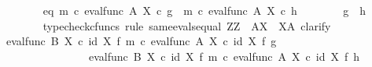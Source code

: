 \begin{isabellebody}
\isanewline
\ \ \ \ \ \ \isamarkupfalse%
\ eq{\isacharcolon}{\kern0pt}\ {\isachardoublequoteopen}{\isacharparenleft}{\kern0pt}m\ {\isasymcirc}\isactrlsub c\ eval{\isacharunderscore}{\kern0pt}func\ A\ X{\isacharparenright}{\kern0pt}\isactrlsup {\isasymsharp}\ {\isasymcirc}\isactrlsub c\ g\ {\isacharequal}{\kern0pt}\ {\isacharparenleft}{\kern0pt}m\ {\isasymcirc}\isactrlsub c\ eval{\isacharunderscore}{\kern0pt}func\ A\ X{\isacharparenright}{\kern0pt}\isactrlsup {\isasymsharp}\ {\isasymcirc}\isactrlsub c\ h{\isachardoublequoteclose}\isanewline
\ \ \ \ \ \ \isamarkupfalse%
\ {\isachardoublequoteopen}g\ {\isacharequal}{\kern0pt}\ h{\isachardoublequoteclose}\isanewline
\ \ \ \ \ \ \isamarkupfalse%
\ {\isacharparenleft}{\kern0pt}typecheck{\isacharunderscore}{\kern0pt}cfuncs{\isacharcomma}{\kern0pt}\ rule\ same{\isacharunderscore}{\kern0pt}evals{\isacharunderscore}{\kern0pt}equal{\isacharbrackleft}{\kern0pt}\ Z{\isacharequal}{\kern0pt}Z{\isacharcomma}{\kern0pt}\ \ A{\isacharequal}{\kern0pt}X{\isacharcomma}{\kern0pt}\ \ X{\isacharequal}{\kern0pt}A{\isacharbrackright}{\kern0pt}{\isacharcomma}{\kern0pt}\ clarify{\isacharparenright}{\kern0pt}\isanewline
\ \ \ \ \ \ \ \ \ \ \isamarkupfalse%
\ {\isachardoublequoteopen}{\isacharparenleft}{\kern0pt}{\isacharparenleft}{\kern0pt}eval{\isacharunderscore}{\kern0pt}func\ B\ X{\isacharparenright}{\kern0pt}\ {\isasymcirc}\isactrlsub c\ {\isacharparenleft}{\kern0pt}id\ X\ {\isasymtimes}\isactrlsub f\ {\isacharparenleft}{\kern0pt}m\ {\isasymcirc}\isactrlsub c\ eval{\isacharunderscore}{\kern0pt}func\ A\ X{\isacharparenright}{\kern0pt}\isactrlsup {\isasymsharp}{\isacharparenright}{\kern0pt}{\isacharparenright}{\kern0pt}\ {\isasymcirc}\isactrlsub c\ {\isacharparenleft}{\kern0pt}id\ X\ {\isasymtimes}\isactrlsub f\ g{\isacharparenright}{\kern0pt}\ \ {\isacharequal}{\kern0pt}\ \isanewline
\ \ \ \ \ \ \ \ \ \ \ \ \ \ \ \ {\isacharparenleft}{\kern0pt}{\isacharparenleft}{\kern0pt}eval{\isacharunderscore}{\kern0pt}func\ B\ X{\isacharparenright}{\kern0pt}\ {\isasymcirc}\isactrlsub c\ {\isacharparenleft}{\kern0pt}id\ X\ {\isasymtimes}\isactrlsub f\ {\isacharparenleft}{\kern0pt}m\ {\isasymcirc}\isactrlsub c\ eval{\isacharunderscore}{\kern0pt}func\ A\ X{\isacharparenright}{\kern0pt}\isactrlsup {\isasymsharp}{\isacharparenright}{\kern0pt}{\isacharparenright}{\kern0pt}\ {\isasymcirc}\isactrlsub c\ {\isacharparenleft}{\kern0pt}id\ X\ {\isasymtimes}\isactrlsub f\ h{\isacharparenright}{\kern0pt}{\isachardoublequoteclose}\isanewline

\end{isabellebody}
